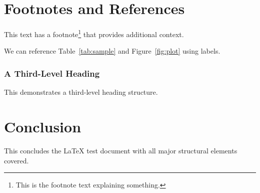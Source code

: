\documentclass{article}
\begin{document}
\section{Footnotes and References}

This text has a footnote\footnote{This is the footnote text explaining something.} that provides additional context.

We can reference Table~\ref{tab:sample} and Figure~\ref{fig:plot} using labels.


\subsubsection{A Third-Level Heading}

This demonstrates a third-level heading structure.

\section{Conclusion}

This concludes the LaTeX test document with all major structural elements covered.
\end{document}
